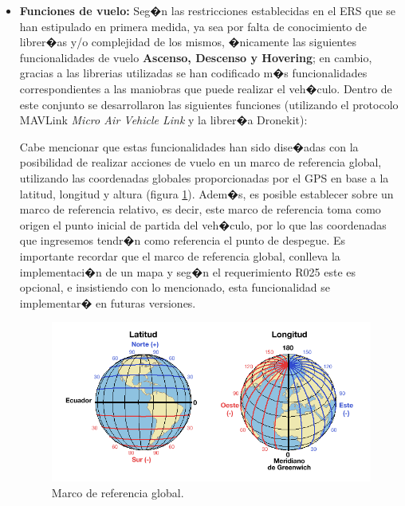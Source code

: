 \begin{itemize}
	
	\item \textbf{Funciones de vuelo: } Seg�n las restricciones establecidas en el ERS que se han estipulado en primera medida, ya sea por falta de conocimiento de librer�as y/o complejidad de los mismos, �nicamente las siguientes funcionalidades de vuelo \textbf{Ascenso, Descenso y Hovering}; en cambio, gracias a las librerias utilizadas se han codificado m�s funcionalidades correspondientes a las maniobras que puede realizar el veh�culo. Dentro de este conjunto se desarrollaron las siguientes funciones (utilizando el protocolo MAVLink \textit{Micro Air Vehicle Link} y la librer�a Dronekit):
	
	
	\par Cabe mencionar que estas funcionalidades han sido dise�adas con la posibilidad de realizar acciones de vuelo en un marco de referencia global, utilizando las coordenadas globales proporcionadas por el GPS en base a la latitud, longitud y altura (figura \ref{fig:latlong}). Adem�s, es posible establecer sobre un marco de referencia relativo, es decir, este marco de referencia toma como origen el punto inicial de partida del veh�culo, por lo que las coordenadas que ingresemos tendr�n como referencia el punto de despegue. Es importante recordar que el marco de referencia global, conlleva la implementaci�n de un mapa y seg�n el requerimiento R025 este es opcional, e insistiendo con lo mencionado, esta funcionalidad se implementar� en futuras versiones.
	
	\begin{figure}[h!]
		\centering
		\includegraphics[width=0.7\linewidth, height=0.2\textheight]{Imagenes/latlong}
		\caption{Marco de referencia global.}
		\label{fig:latlong}
	\end{figure}
	
	
	

\end{itemize}
